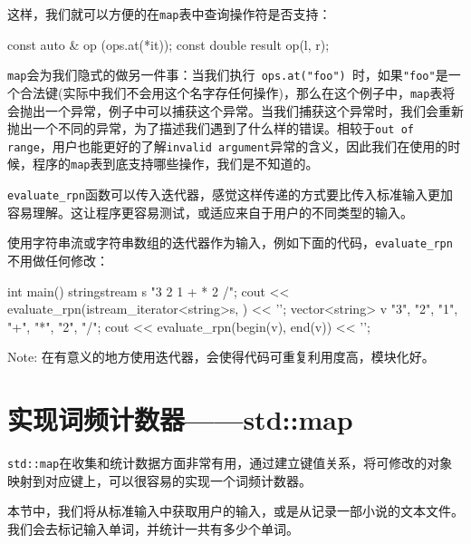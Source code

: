 这样，我们就可以方便的在\texttt{map}表中查询操作符是否支持：

\begin{codebox}[cpp]
const auto & op (ops.at(*it));
const double result {op(l, r)};
\end{codebox}

\texttt{map}会为我们隐式的做另一件事：当我们执行\texttt{ ops.at("foo") }时，如果\texttt{"foo"}是一个合法键(实际中我们不会用这个名字存任何操作)，那么在这个例子中，\texttt{map}表将会抛出一个异常，例子中可以捕获这个异常。当我们捕获这个异常时，我们会重新抛出一个不同的异常，为了描述我们遇到了什么样的错误。相较于\texttt{out of range}，用户也能更好的了解\texttt{invalid argument}异常的含义，因此我们在使用的时候，程序的\texttt{map}表到底支持哪些操作，我们是不知道的。


\texttt{evaluate\_rpn}函数可以传入迭代器，感觉这样传递的方式要比传入标准输入更加容易理解。这让程序更容易测试，或适应来自于用户的不同类型的输入。

使用字符串流或字符串数组的迭代器作为输入，例如下面的代码，\texttt{evaluate\_rpn}不用做任何修改：

\begin{codebox}[cpp]
int main()
{
    stringstream s {"3 2 1 + * 2 /"};
    cout << evaluate_rpn(istream_iterator<string>{s}, {}) << '\n';
    vector<string> v {"3", "2", "1", "+", "*", "2", "/"};
    cout << evaluate_rpn(begin(v), end(v)) << '\n';
}
\end{codebox}

\begin{myInfoBox}
Note: 在有意义的地方使用迭代器，会使得代码可重复利用度高，模块化好。
\end{myInfoBox}


\section{实现词频计数器——std::map}

\texttt{std::map}在收集和统计数据方面非常有用，通过建立键值关系，将可修改的对象映射到对应键上，可以很容易的实现一个词频计数器。


本节中，我们将从标准输入中获取用户的输入，或是从记录一部小说的文本文件。我们会去标记输入单词，并统计一共有多少个单词。

